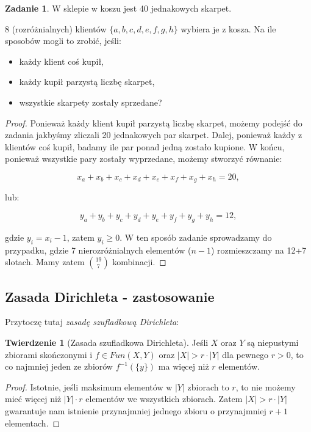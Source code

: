 \documentclass[11pt]{article}
\theoremstyle{definition}
\newtheorem{zadanie}{Zadanie}
\numberwithin{zadanie}{subsection}
\newtheorem{theorem}{Twierdzenie}
\begin{document}
\begin{zadanie}
    W sklepie w koszu jest 40 jednakowych skarpet.

    8 (rozróżnialnych) klientów $\{a, b, c, d, e, f, g, h \}$ wybiera je z kosza. Na ile sposobów mogli to zrobić, jeśli:
    \begin{itemize}
        \item każdy klient coś kupił,
        \item każdy kupił parzystą liczbę skarpet,
        \item wszystkie skarpety zostały sprzedane?
    \end{itemize}
\end{zadanie}
\begin{proof}
    Ponieważ każdy klient kupił parzystą liczbę skarpet, możemy podejść do zadania jakbyśmy zliczali 20 jednakowych par skarpet. Dalej, ponieważ każdy z klientów coś kupił, badamy ile par ponad jedną zostało kupione. W końcu, ponieważ wszystkie pary zostały wyprzedane, możemy stworzyć równanie:

    $$x_a+x_b+x_c+x_d+x_e+x_f+x_g+x_h = 20,$$

    lub:

    $$y_a+y_b+y_c+y_d+y_e+y_f+y_g+y_h = 12,$$

    gdzie $y_i = x_i-1$, zatem $y_i\geq 0$. W ten sposób zadanie sprowadzamy do przypadku, gdzie 7 nierozróżnialnych elementów ($n-1$) rozmieszczamy na 12+7 slotach. Mamy zatem $\binom {19}7$ kombinacji.

\end{proof}

\subsection{Zasada Dirichleta - zastosowanie}
Przytoczę tutaj \textit{zasadę szufladkową Dirichleta}:

\begin{theorem}[Zasada szufladkowa Dirichleta]
    Jeśli $X$ oraz $Y$ są niepustymi zbiorami skończonymi i $f\in Fun(X,Y)$ oraz
    $|X| > r\cdot |Y|$ dla pewnego $r>0$, to co najmniej jeden ze zbiorów $f^{-1}(\{y\})$ ma więcej niż $r$ elementów.
\end{theorem}
\begin{proof}
    Istotnie, jeśli maksimum elementów w $|Y|$ zbiorach to $r$, to nie możemy mieć więcej niż $|Y|\cdot r$ elementów we wszystkich zbiorach. Zatem $|X| >r\cdot|Y|$ gwarantuje nam istnienie przynajmniej jednego zbioru o przynajmniej $r+1$ elementach.
\end{proof}
\end{document}
